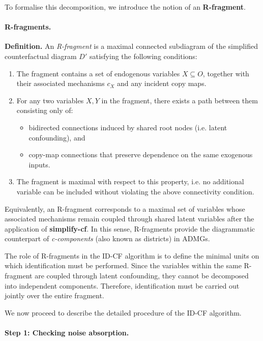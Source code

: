 \documentclass[a4paper]{report}
\begin{document}
To formalise this decomposition, we introduce the notion of an \textbf{R-fragment}.

\paragraph{R-fragments.}

\textbf{Definition.}
An \emph{R-fragment} is a maximal connected subdiagram of the simplified counterfactual diagram $D'$ satisfying the following conditions:

\begin{enumerate}
    \item The fragment contains a set of endogenous variables $X \subseteq O$, together with their associated mechanisms $c_X$ and any incident copy maps.

    \item For any two variables $X, Y$ in the fragment, there exists a path between them consisting only of:
    \begin{itemize}
        \item bidirected connections induced by shared root nodes (i.e. latent confounding), and
        \item copy-map connections that preserve dependence on the same exogenous inputs.
    \end{itemize}

    \item The fragment is maximal with respect to this property, i.e. no additional variable can be included without violating the above connectivity condition.
\end{enumerate}

Equivalently, an R-fragment corresponds to a maximal set of variables whose associated mechanisms remain coupled through shared latent variables after the application of \textbf{simplify-cf}. In this sense, R-fragments provide the diagrammatic counterpart of \emph{c-components} (also known as districts) in ADMGs.

The role of R-fragments in the ID-CF algorithm is to define the minimal units on which identification must be performed. Since the variables within the same R-fragment are coupled through latent confounding, they cannot be decomposed into independent components. Therefore, identification must be carried out jointly over the entire fragment.

We now proceed to describe the detailed procedure of the ID-CF algorithm. 

\paragraph{Step 1: Checking noise absorption.}  
\end{document}
